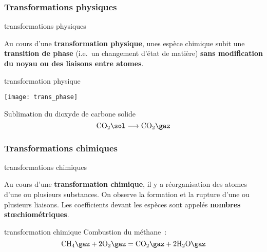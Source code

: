 \documentclass[../main/main.tex]{subfiles}
\begin{document}
\subsubsection{Transformations physiques}

\begin{tcbraster}[raster columns=2, raster equal height=rows]
    \begin{defi}[label=def:transnuc]{transformations physiques}

        Au cours d'une \textbf{transformation physique}, unes espèce chimique
        subit une \textbf{transition de phase} (i.e.\ un changement d'état de
        matière) \textbf{sans modification du noyau ou des liaisons entre
        atomes}.
    \end{defi}
    \begin{exem}[label=exem:transnuc]{transformation physique}
        \begin{center}
            \texttt{[image: trans\_phase]}
        \end{center}
        Sublimation du dioxyde de carbone solide
        \[ \mathrm{CO}_2{}\sol
            \longrightarrow
        \mathrm{CO}_2{}\gaz\]
    \end{exem}
\end{tcbraster}

\subsubsection{Transformations chimiques}

\begin{tcbraster}[raster columns=2, raster equal height=rows]
    \begin{defi}[label=def:transnuc]{transformations chimiques}

        Au cours d'une \textbf{transformation chimique}, il y a réorganisation
        des atomes d'une ou plusieurs substances. On observe la formation et la
        rupture d'une ou plusieurs liaisons. Les coefficients devant les espèces
        sont appelés \textbf{nombres stœchiométriques}.
    \end{defi}
    \begin{exem}[label=exem:transnuc]{transformation chimique}
        Combustion du méthane~:
        \begin{equation*}
            \mathrm{CH}_4{}\gaz + 2\mathrm{O}_2{}\gaz
            =
            \mathrm{CO}_2{}\gaz + 2\mathrm{H}_2\mathrm{O}\gaz
        \end{equation*}
    \end{exem}
\end{tcbraster}
\end{document}
